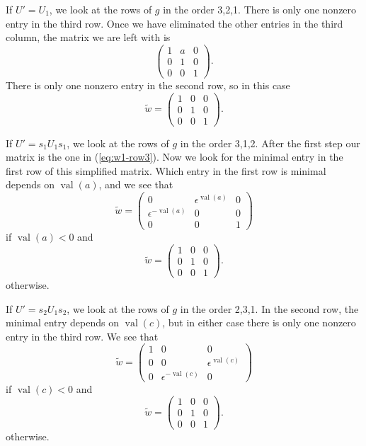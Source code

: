 \documentclass{amsart}
\theoremstyle{definition}
\def\e{\epsilon}
\def\w{\widetilde{w}}
\def\val{\mathop{\mathrm{val}}}
\begin{document}
  If $U' = U_1$, we look at the rows of $g$ in the order 3,2,1.  There is only
  one nonzero entry in the third row.  Once we have eliminated the other
  entries in the third column, the matrix we are left with is
  \begin{equation} \label{eq:w1-row3}
    \begin{pmatrix}
      1 & a & 0 \\ 
      0 & 1 & 0 \\
      0 & 0 & 1
    \end{pmatrix}.
  \end{equation}
  There is only one nonzero entry in the second row, so in this case
  \begin{equation*}\w = \begin{pmatrix}
      1 & 0 & 0 \\
      0 & 1 & 0 \\
      0 & 0 & 1
    \end{pmatrix}.
  \end{equation*}

  If $U' = s_1 U_1 s_1$, we look at the rows of $g$ in the order 3,1,2.  After
  the first step our matrix is the one in (\ref{eq:w1-row3}).  Now we look for
  the minimal entry in the first row of this simplified matrix.  Which entry in
  the first row is minimal depends on $\val(a)$, and we see that
  \begin{equation*}
    \w = \begin{pmatrix}
      0 & \e^{\val(a)} & 0 \\
      \e^{-\val(a)} & 0 & 0 \\
      0 & 0 & 1
    \end{pmatrix}
  \end{equation*}
  if $\val(a) < 0$ and 
  \begin{equation*}\w = \begin{pmatrix}
      1 & 0 & 0 \\
      0 & 1 & 0 \\
      0 & 0 & 1
    \end{pmatrix}.
  \end{equation*}
  otherwise.

  If $U' = s_2 U_1 s_2$, we look at the rows of $g$ in the order 2,3,1.  In the
  second row, the minimal entry depends on $\val(c)$, but in either case there
  is only one nonzero entry in the third row.  We see that
  \begin{equation*}
    \w = \begin{pmatrix}
      1 & 0 & 0 \\
      0 & 0 & \e^{\val(c)} \\
      0 & \e^{-\val(c)}  & 0
    \end{pmatrix}
  \end{equation*}
  if $\val(c) < 0$ and 
  \begin{equation*}\w = \begin{pmatrix}
      1 & 0 & 0 \\
      0 & 1 & 0 \\
      0 & 0 & 1
    \end{pmatrix}.
  \end{equation*}
  otherwise.
\end{document}
